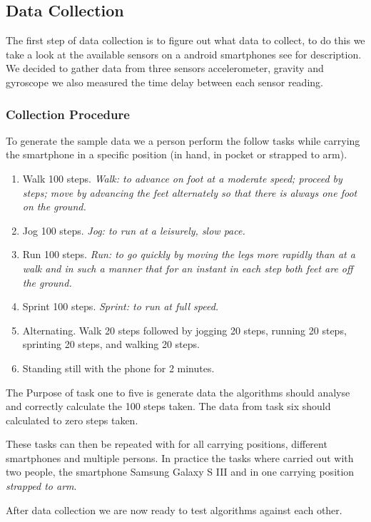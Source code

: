 \subsection{Data Collection}
The first step of data collection is to figure out what data to collect, to do this we take a look at the available sensors on a android smartphones see \citet{android:sensor} for description. We decided to gather data from three sensors accelerometer, gravity and gyroscope we also measured the time delay between each sensor reading.

\subsubsection{Collection Procedure}
To generate the sample data we a person perform the follow tasks while carrying the smartphone in a specific position (in hand, in pocket or strapped to arm). 
\begin{enumerate}
\item Walk 100 steps. \textit{Walk: to advance on foot at a moderate speed; proceed by steps; move by advancing the feet alternately so that there is always one foot on the ground.} %
\item Jog 100 steps. \textit{Jog: to run at a leisurely, slow pace.} %
\item Run 100 steps. \textit{Run: to go quickly by moving the legs more rapidly than at a walk and in such a manner that for an instant in each step both feet are off the ground.} %
\item Sprint 100 steps. \textit{Sprint: to run at full speed.} %
\item Alternating. Walk 20 steps followed by jogging 20 steps, running 20 steps, sprinting 20 steps, and walking 20 steps.
\item Standing still with the phone for 2 minutes.
\end{enumerate}

The Purpose of task one to five is generate data the algorithms should analyse and correctly calculate the 100 steps taken. The data from task six should calculated to zero steps taken.

These tasks can then be repeated with for all carrying positions, different smartphones and multiple persons. In practice the tasks where carried out with two people, the smartphone Samsung Galaxy S III and in one carrying position \textit{strapped to arm}.

After data collection we are now ready to test algorithms against each other.